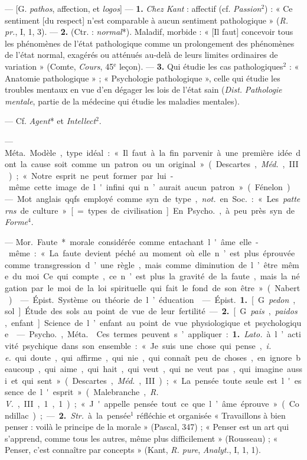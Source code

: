 \begin{itemize}[leftmargin=1cm, label=, itemsep=1pt]
 — [G. {\it pathos}, affection, et {\it logos}] — {\bf 1.}
{\it Chez Kant} : affectif (cf. {\it Passion}$^2$) : « Ce sentiment [du
respect] n’est comparable à aucun sentiment pathologique » ({\it R. pr.}, I,
1, 3). — {\bf 2.} (Ctr. : {\it normal}*). Maladif, morbide : « [Il faut]
concevoir tous les phénomènes de l’état pathologique comme un prolongement
des phénomènes de l'état normal, exagérés ou atténués au-delà de leurs
limites ordinaires de variation » (Comte, {\it Cours}, 45$^\text{e}$ leçon).
— {\bf 3.} Qui étudie les cas pathologiques$^2$ : « Anatomie pathologique » ;
« Psychologie pathologique », celle qui étudie les troubles mentaux en vue
d'en dégager les lois de l'état sain ({\it Dist.} {\it Pathologie mentale},
partie de la médecine qui étudie les maladies mentales).

 — Cf. {\it Agent}* et {\it Intellect}$^2$.

 — \si{Méta.} Modèle, type idéal : « Il faut à la fin parvenir à
une première idée dont la cause soit comme un patron ou un original...
» (Descartes, {\it Méd.}, III) ; « Notre esprit ne peut former par lui-même
cette image de l'infini qui n’aurait aucun patron » (Fénelon).

 — Mot anglais qqfs employé comme syn. de type, {\it not.} en
\si{Soc.} : « Les {\it patterns} de culture » [= types de civilisation]. En
\si{Psycho.}, à peu près syn. de {\it Forme}$^4$.

 — \si{Mor.} Faute* morale considérée comme entachant l'âme
elle-même : « La faute devient péché au moment où elle n’est plus éprouvée
comme transgression d’une règle, mais comme diminution de l’être même du moi.
Ce qui compte, ce n’est plus la gravité de la faute, mais la négation par le
moi de la loi spirituelle qui fait le fond de son être » (Nabert).

 — \si{Épist.} Système ou théorie de l’éducation.

 — \si{Épist.} {\bf 1.} [G. {\it pedon}, sol]. Étude des sols
au point de vue de leur fertilité. — {\bf 2.} [G. {\it pais}, {\it paidos},
enfant]. Science de l’enfant au point de vue physiologique et psychologique.

 — \si{Psycho.}, \si{Méta.}  Ces termes
peuvent s’appliquer : {\bf 1.} {\it Lato.} à l’activité psychique dans son
ensemble : « Je suis une chose qui pense, {\it i. e.} qui doute, qui affirme,
qui nie, qui connaît peu de choses, en ignore beaucoup, qui aime, qui hait,
qui veut, qui ne veut pas, qui imagine aussi et qui sent » (Descartes,
{\it Méd.}, III) ; « La pensée toute seule est l'essence de l'esprit
» (Malebranche, {\it R. V.}, III, 1, 1) ; « J'appelle pensée tout ce que
l’âme éprouve » (Condillac) ; — {\bf 2.} {\it Str.} à la pensée$^1$ réfléchie
et organisée « Travaillons à bien penser : voilà le principe de la morale
» (Pascal, 347) ; « Penser est un art qui s’apprend, comme tous les autres,
même plus difficilement » (Rousseau) ; « Penser, c’est connaître par
concepts » (Kant, {\it R. pure}, {\it Analyt.}, I, 1, 1).


\end{itemize}

